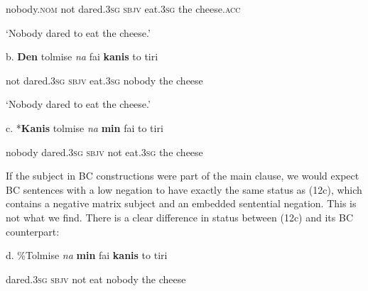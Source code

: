 \documentclass[output=paper]{langsci/langscibook}
\begin{document}
\begin{styleTextkrperxxi}
    nobody.\textsc{nom}  not   dared.\textsc{3sg  sbjv}  eat.\textsc{3sg} the   cheese.\textsc{acc}
\end{styleTextkrperxxi}

\begin{styleTextkrperxxi}
    ‘Nobody dared to eat the cheese.’
\end{styleTextkrperxxi}

\begin{styleTextkrperxxi}
  b.  \textbf{Den}  tolmise    \textit{na} fai       \textbf{kanis} to   tiri
\end{styleTextkrperxxi}

\begin{styleTextkrperxxi}
    not  dared.\textsc{3sg  sbjv}  eat.\textsc{3sg} nobody  the    cheese
\end{styleTextkrperxxi}

\begin{styleTextkrperxxi}
    ‘Nobody dared to eat the cheese.’
\end{styleTextkrperxxi}

\begin{styleTextkrperxxi}
  c.  *\textbf{Kanis}  tolmise  \textit{na} \textbf{min}   fai  to   tiri
\end{styleTextkrperxxi}

\begin{styleTextkrperxxi}
    nobody  dared.\textsc{3sg  sbjv}  not  eat.\textsc{3sg}   the  cheese
\end{styleTextkrperxxi}

\begin{styleTextkrperxxi}
If the subject in BC constructions were part of the main clause, we would expect BC sentences with a low negation to have exactly the same status as (12c), which contains a negative matrix subject and an embedded sentential negation. This is not what we find. There is a clear difference in status between (12c) and its BC counterpart:
\end{styleTextkrperxxi}

\begin{styleTextkrperxxi}
  d.   \%Tolmise  \textit{na}   \textbf{min} fai   \textbf{kanis}   to  tiri
\end{styleTextkrperxxi}

\begin{styleTextkrperxxi}
    dared.\textsc{3sg}  \textsc{sbjv}  not  eat  nobody  the   cheese
\end{styleTextkrperxxi}
\end{document}
